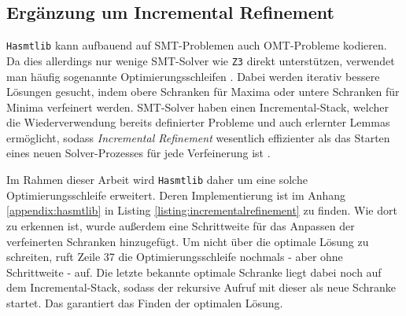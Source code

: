 \subsection{Ergänzung um Incremental Refinement}
\label{subsec:incrementalrefinement}
\texttt{Hasmtlib} kann aufbauend auf SMT-Problemen auch OMT-Probleme kodieren.
Da dies allerdings nur wenige SMT-Solver wie \texttt{Z3} direkt unterstützen, verwendet man häufig sogenannte Optimierungsschleifen \cite{nuz3}.
Dabei werden iterativ bessere Lösungen gesucht, indem obere Schranken für Maxima oder untere Schranken für Minima verfeinert werden.
SMT-Solver haben einen \gls{Incremental-Stack}, welcher die Wiederverwendung bereits definierter Probleme und auch erlernter Lemmas ermöglicht,
sodass \textit{\gls{Incremental Refinement}} wesentlich effizienter als das Starten eines neuen Solver-Prozesses für jede Verfeinerung ist \cite{incremental}.

Im Rahmen dieser Arbeit wird \texttt{Hasmtlib} daher um eine solche Optimierungsschleife erweitert.
Deren Implementierung ist im Anhang \ref{appendix:hasmtlib} in Listing \ref{listing:incrementalrefinement} zu finden.
Wie dort zu erkennen ist, wurde außerdem eine Schrittweite für das Anpassen der verfeinerten Schranken hinzugefügt.
Um nicht über die optimale Lösung zu schreiten, ruft Zeile 37 die Optimierungsschleife nochmals - aber ohne Schrittweite - auf.
Die letzte bekannte optimale Schranke liegt dabei noch auf dem Incremental-Stack, sodass der rekursive Aufruf mit dieser als neue Schranke startet.
Das garantiert das Finden der optimalen Lösung.
